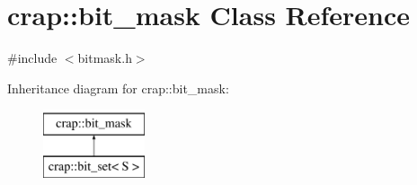 \hypertarget{classcrap_1_1bit__mask}{\section{crap\-:\-:bit\-\_\-mask Class Reference}
\label{classcrap_1_1bit__mask}
}


{\ttfamily \#include $<$bitmask.\-h$>$}

Inheritance diagram for crap\-:\-:bit\-\_\-mask\-:\begin{figure}[H]
\begin{center}
\leavevmode
\includegraphics[height=2.000000cm]{classcrap_1_1bit__mask}
\end{center}
\end{figure}

